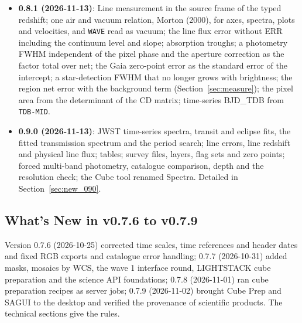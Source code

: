 \documentclass[11pt,a4paper]{article}
\newcommand{\code}[1]{\texttt{\small #1}}
\begin{document}
\begin{itemize}[nosep]
    \item \textbf{0.8.1 (2026-11-13)}: Line measurement in the source frame of the typed redshift; one air and vacuum relation, Morton (2000), for axes, spectra, plots and velocities, and \code{WAVE} read as vacuum; the line flux error without ERR including the continuum level and slope; absorption troughs; a photometry FWHM independent of the pixel phase and the aperture correction as the factor total over net; the Gaia zero-point error as the standard error of the intercept; a star-detection FWHM that no longer grows with brightness; the region net error with the background term (Section~\ref{sec:measure}); the pixel area from the determinant of the CD matrix; time-series BJD\_TDB from \code{TDB-MID}.
    \item \textbf{0.9.0 (2026-11-13)}: JWST time-series spectra, transit and eclipse fits, the fitted transmission spectrum and the period search; line errors, line redshift and physical line flux; tables; survey files, layers, flag sets and zero points; forced multi-band photometry, catalogue comparison, depth and the resolution check; the Cube tool renamed Spectra. Detailed in Section~\ref{sec:new_090}.
    \end{itemize}

    \subsection{What's New in v0.7.6 to v0.7.9}
    \label{sec:new_076_079}

    Version 0.7.6 (2026-10-25) corrected time scales, time references and header dates and fixed RGB exports and catalogue error handling; 0.7.7 (2026-10-31) added masks, mosaics by WCS, the wave 1 interface round, LIGHTSTACK cube preparation and the science API foundations; 0.7.8 (2026-11-01) ran cube preparation recipes as server jobs; 0.7.9 (2026-11-02) brought Cube Prep and SAGUI to the desktop and verified the provenance of scientific products. The technical sections give the rules.
\end{document}
